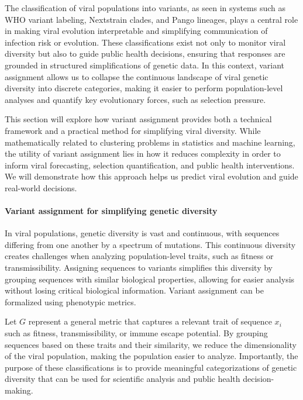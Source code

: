 The classification of viral populations into variants, as seen in systems such as WHO variant labeling, Nextstrain clades, and Pango lineages, plays a central role in making viral evolution interpretable and simplifying communication of infection risk or evolution. \cite{Hadfield2018, aksamentov2021nextclade}
These classifications exist not only to monitor viral diversity but also to guide public health decisions, ensuring that responses are grounded in structured simplifications of genetic data.
In this context, variant assignment allows us to collapse the continuous landscape of viral genetic diversity into discrete categories, making it easier to perform population-level analyses and quantify key evolutionary forces, such as selection pressure.

This section will explore how variant assignment provides both a technical framework and a practical method for simplifying viral diversity.
While mathematically related to clustering problems in statistics and machine learning, the utility of variant assignment lies in how it reduces complexity in order to inform viral forecasting, selection quantification, and public health interventions.
We will demonstrate how this approach helps us predict viral evolution and guide real-world decisions.

\paragraph{Variant assignment for simplifying genetic diversity}

In viral populations, genetic diversity is vast and continuous, with sequences differing from one another by a spectrum of mutations. This continuous diversity creates challenges when analyzing population-level traits, such as fitness or transmissibility. Assigning sequences to variants simplifies this diversity by grouping sequences with similar biological properties, allowing for easier analysis without losing critical biological information.
Variant assignment can be formalized using phenotypic metrics.

Let $G$ represent a general metric that captures a relevant trait of sequence $x_i$ such as fitness, transmissibility, or immune escape potential.
By grouping sequences based on these traits and their similarity, we reduce the dimensionality of the viral population, making the population easier to analyze.
Importantly, the purpose of these classifications is to provide meaningful categorizations of genetic diversity that can be used for scientific analysis and public health decision-making.

